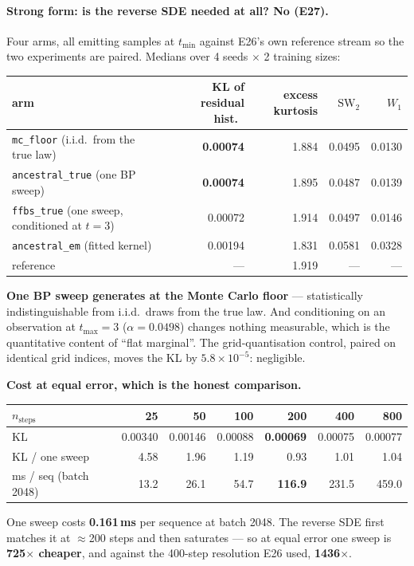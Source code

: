 \documentclass[10pt,a4paper]{article}
\newcommand{\code}[1]{\texttt{\small #1}}
\newcommand{\st}[1]{\textbf{#1}}
\begin{document}
\paragraph{Strong form: is the reverse SDE needed at all? No (E27).}
Four arms, all emitting samples at $t_{\min}$ against E26's own reference stream so the two
experiments are paired. Medians over 4 seeds $\times$ 2 training sizes:

\medskip
\noindent\begin{tabular}{@{}l rrrr@{}}
\toprule
arm & KL of residual hist.\ & excess kurtosis & $\mathrm{SW}_2$ & $W_1$ \\
\midrule
\code{mc\_floor} (i.i.d.\ from the true law) & \st{0.00074} & 1.884 & 0.0495 & 0.0130 \\
\code{ancestral\_true} (one BP sweep) & \st{0.00074} & 1.895 & 0.0487 & 0.0139 \\
\code{ffbs\_true} (one sweep, conditioned at $t=3$) & 0.00072 & 1.914 & 0.0497 & 0.0146 \\
\code{ancestral\_em} (fitted kernel) & 0.00194 & 1.831 & 0.0581 & 0.0328 \\
\midrule
reference & --- & 1.919 & --- & --- \\
\bottomrule
\end{tabular}

\medskip
\st{One BP sweep generates at the Monte Carlo floor} --- statistically indistinguishable from
i.i.d.\ draws from the true law. And conditioning on an observation at $t_{\max}=3$
($\alpha=0.0498$) changes nothing measurable, which is the quantitative content of ``flat
marginal''. The grid-quantisation control, paired on identical grid indices, moves the KL by
$5.8\times10^{-5}$: negligible.

\smallskip
\noindent\st{Cost at equal error, which is the honest comparison.}
\par\medskip
\noindent\begin{tabular}{@{}l rrrrrr@{}}
\toprule
$n_{\text{steps}}$ & 25 & 50 & 100 & 200 & 400 & 800 \\
\midrule
KL & 0.00340 & 0.00146 & 0.00088 & \st{0.00069} & 0.00075 & 0.00077 \\
KL / one sweep & 4.58 & 1.96 & 1.19 & 0.93 & 1.01 & 1.04 \\
ms / seq (batch 2048) & 13.2 & 26.1 & 54.7 & \st{116.9} & 231.5 & 459.0 \\
\bottomrule
\end{tabular}

\medskip
One sweep costs \st{0.161\,ms} per sequence at batch 2048. The reverse SDE first matches it at
$\approx$200 steps and then saturates --- so at equal error one sweep is \st{725$\times$
cheaper}, and against the 400-step resolution E26 used, \st{1436$\times$}.
\end{document}
